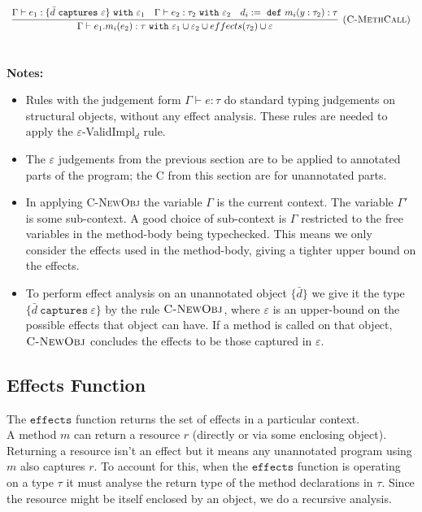 \documentclass{llncs}
\newcommand{\keywadj}[1]{\mathtt{#1}}
\newcommand{\keyw}[1]{\keywadj{#1}~}
\begin{document}
\[
\begin{array}{c}
\infer[\textsc{(C-MethCall)}]
	{\Gamma \vdash e_1.m_i(e_2) : \tau~ \keyw{with} \varepsilon_1 \cup \varepsilon_2 \cup effects(\tau_2) \cup \varepsilon}
	{\Gamma \vdash e_1 : \{ \bar d~\keyw{captures} \varepsilon \}~\keyw{with} \varepsilon_1 & \Gamma \vdash e_2:\tau_2~\keyw{with} \varepsilon_2&d_i :=~\keyw{def} m_i(y:\tau_2):\tau } \\[5ex]
\end{array}
\]


\noindent \textbf{Notes:}

\begin{itemize}
	\item Rules with the judgement form $\Gamma \vdash e : \tau$ do standard typing judgements on structural objects, without any effect analysis. These rules are needed to apply the $\varepsilon$-ValidImpl$_d$ rule.
	\item The \textsc{$\varepsilon$} judgements from the previous section are to be applied to annotated parts of the program; the \textsc{C} from this section are for unannotated parts.
	\item In applying \textsc{C-NewObj} the variable $\Gamma$ is the current context. The variable $\Gamma'$ is some sub-context. A good choice of sub-context is $\Gamma$ restricted to the free variables in the method-body being typechecked. This means we only consider the effects used in the method-body, giving a tighter upper bound on the effects.
	\item To perform effect analysis on an unannotated object $\{ \bar d \}$ we give it the type $\{ \bar d~\keyw{captures} \varepsilon \}$ by the rule $\textsc{C-NewObj}$, where $\varepsilon$ is an upper-bound on the possible effects that object can have. If a method is called on that object, $\textsc{C-NewObj}$ concludes the effects to be those captured in $\varepsilon$.
\end{itemize}

\subsection{Effects Function}

\noindent
The $\keywadj{effects}$ function returns the set of effects in a particular context. \\

\noindent
A method $m$ can return a resource $r$ (directly or via some enclosing object). Returning a resource isn't an effect but it means any unannotated program using $m$ also captures $r$. To account for this, when the $\keywadj{effects}$ function is operating on a type $\tau$ it must analyse the return type of the method declarations in $\tau$. Since the resource might be itself enclosed by an object, we do a recursive analysis.
\end{document}
